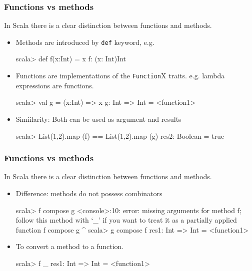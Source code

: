 \documentclass{beamer}
\begin{document}
\begin{frame}[fragile]
\frametitle{Functions vs methods}

In Scala there is a clear distinction between functions and methods.
\begin{itemize}
\item Methods are introduced by {\tt def} keyword, e.g. 
\begin{code}
scala> def f(x:Int) = x
f: (x: Int)Int
\end{code}
\item Functions are implementations of the 
{\tt Function}X traits. e.g. lambda expressions are functions. 
\begin{code}
scala> val g = (x:Int) => x
g: Int => Int = <function1>
\end{code}
\item Simiilarity: Both can be used as argument and results
\begin{code}
scala> List(1,2).map (f) == List(1,2).map (g)
res2: Boolean = true
\end{code}
\end{itemize}

\end{frame}
\begin{frame}[fragile]
\frametitle{Functions vs methods}

In Scala there is a clear distinction between functions and methods.
\begin{itemize}
\item Difference: methods do not possess combinators
\begin{code}
scala> f compose g
<console>:10: error: missing arguments for method f;
follow this method with `_' if you want to treat it as 
a partially applied function
              f compose g
              ^
scala> g compose f
res1: Int => Int = <function1>
\end{code}
\item To convert a method to a function.
\begin{code}
scala> f _
res1: Int => Int = <function1>
\end{code}
\end{itemize}

\end{frame}
\end{document}
